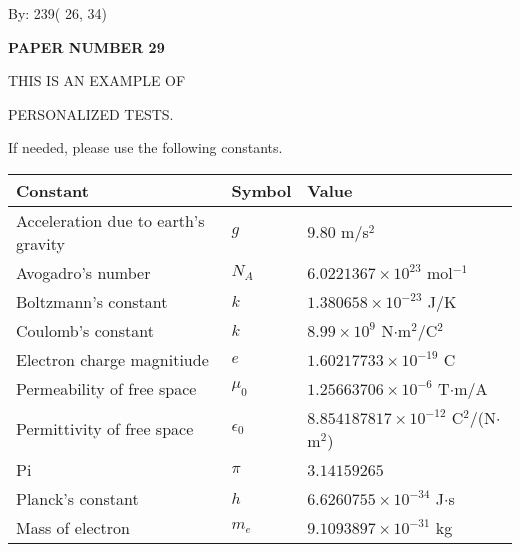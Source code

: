 \documentclass[12pt]{article}
\begin{document}
   
\hspace{1.0in} By: 
         239(         26,          34)
   
   
   
   
\newpage 
\setcounter{page}{ 
    29001 } 
   
   
   
   
 {\textbf{ \Large{ PAPER NUMBER          29 }}}
   
   
\vspace{0.2in}
   
   
   
   
   
   
   
   
 \vspace{0.2in}
 
 
{\Huge  THIS IS AN EXAMPLE OF}
 
{\Huge  PERSONALIZED TESTS. }
 
If needed, please use the following constants.
 
 
 
\noindent\begin{tabular}{|l|l|l|}
\hline
Constant & Symbol & Value \\
\hline
Acceleration due to earth's gravity &
$g$ &
 $ 9.80 $
m/s$^2$ \\
\hline
Avogadro's number &
$N_A$ &
 $ 6.0221367 \times 10^{23} $
mol$^{-1}$ \\
\hline
Boltzmann's constant &
$k$ &
 $ 1.380658 \times 10^{-23} $
J/K \\
\hline
Coulomb's constant &
$k$ &
 $ 8.99 \times 10^{9} $
N$\cdot $m$^2$/C$^2$ \\
\hline
Electron charge magnitiude &
$e$ &
 $ 1.60217733 \times 10^{-19} $
C \\
\hline
Permeability of free space &
$\mu _0$ &
 $ 1.25663706 \times 10^{-6} $
T$\cdot $m/A \\
\hline
Permittivity of free space &
$\epsilon _0$ &
 $ 8.854187817 \times 10^{-12} $
C$^2$/(N$\cdot $m$^2$) \\
\hline
Pi &
$\pi$ &
 $ 3.14159265 $
$ $ \\
\hline
Planck's constant &
$h$ &
 $ 6.6260755 \times 10^{-34} $
J$\cdot $s \\
\hline
Mass of electron &
$m_e$ &
 $ 9.1093897 \times 10^{-31} $
kg \\
\hline
\end{tabular}
 
\end{document}
